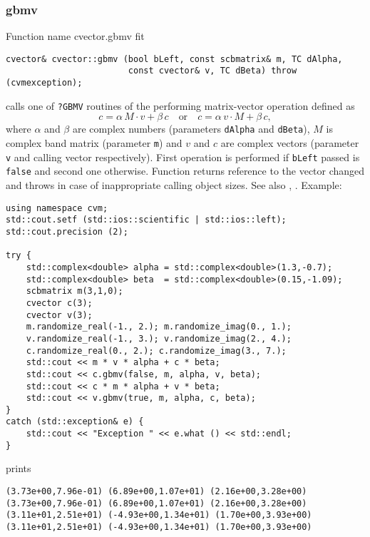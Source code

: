 \subsubsection{gbmv}
Function%
\pdfdest name {cvector.gbmv} fit
\begin{verbatim}
cvector& cvector::gbmv (bool bLeft, const scbmatrix& m, TC dAlpha,
                        const cvector& v, TC dBeta) throw (cvmexception);
\end{verbatim}
calls one of \verb"?GBMV" routines of the
performing  matrix-vector operation defined as
\begin{equation*}
c=\alpha\,M\cdot v + \beta\,c\quad\text{or}\quad c=\alpha\,v\cdot M + \beta\, c,
\end{equation*}
where $\alpha$ and $\beta$ are complex numbers
(parameters \verb"dAlpha" and \verb"dBeta"),
$M$ is  complex band matrix (parameter \verb"m")
and $v$ and $c$ are complex vectors (parameter \verb"v"
and calling vector respectively).
First operation is performed if \verb"bLeft" passed
is \verb"false" and second one otherwise.
Function
returns  reference to the vector changed and throws
in case of inappropriate calling object sizes.
See also
,
.
Example:
\begin{Verbatim}
using namespace cvm;
std::cout.setf (std::ios::scientific | std::ios::left);
std::cout.precision (2);

try {
    std::complex<double> alpha = std::complex<double>(1.3,-0.7);
    std::complex<double> beta  = std::complex<double>(0.15,-1.09);
    scbmatrix m(3,1,0);
    cvector c(3);
    cvector v(3);
    m.randomize_real(-1., 2.); m.randomize_imag(0., 1.);
    v.randomize_real(-1., 3.); v.randomize_imag(2., 4.);
    c.randomize_real(0., 2.); c.randomize_imag(3., 7.);
    std::cout << m * v * alpha + c * beta;
    std::cout << c.gbmv(false, m, alpha, v, beta);
    std::cout << c * m * alpha + v * beta;
    std::cout << v.gbmv(true, m, alpha, c, beta);
}
catch (std::exception& e) {
    std::cout << "Exception " << e.what () << std::endl;
}
\end{Verbatim}
prints
\begin{Verbatim}
(3.73e+00,7.96e-01) (6.89e+00,1.07e+01) (2.16e+00,3.28e+00)
(3.73e+00,7.96e-01) (6.89e+00,1.07e+01) (2.16e+00,3.28e+00)
(3.11e+01,2.51e+01) (-4.93e+00,1.34e+01) (1.70e+00,3.93e+00)
(3.11e+01,2.51e+01) (-4.93e+00,1.34e+01) (1.70e+00,3.93e+00)
\end{Verbatim}
\newpage





